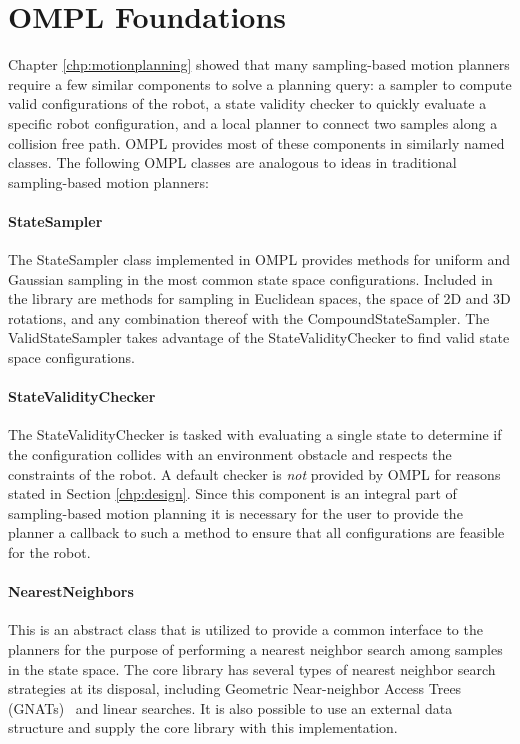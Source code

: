 \section {OMPL Foundations}
Chapter \ref{chp:motionplanning} showed that many sampling-based motion planners
require a few similar components to solve a planning query: a sampler to compute
valid configurations of the robot, a state validity checker to quickly evaluate
a specific robot configuration, and a local planner to connect two samples along
a collision free path.  OMPL provides most of these components in similarly
named classes.  The following OMPL classes are analogous to ideas in traditional
sampling-based motion planners:

\paragraph {StateSampler} The StateSampler class implemented in OMPL
provides methods for uniform and Gaussian sampling in the most common state
space configurations.  Included in the library are methods for sampling
in Euclidean spaces, the space of 2D and 3D rotations, and any combination
thereof with the CompoundStateSampler.  The ValidStateSampler takes advantage
of the StateValidityChecker to find valid state space configurations.

\paragraph {StateValidityChecker} The StateValidityChecker is tasked with
evaluating a single state to determine if the configuration collides with an
environment obstacle and respects the constraints of the robot.  A default
checker is \emph{not} provided by OMPL for reasons stated in Section
\ref{chp:design}.  Since this component is an integral part of sampling-based
motion planning it is necessary for the user to provide the planner a callback
to such a method to ensure that all configurations are feasible for the robot.

\paragraph {NearestNeighbors} This is an abstract class that is utilized
to provide a common interface to the planners for the purpose of performing a
nearest neighbor search among samples in the state space.  The core library
has several types of nearest neighbor search strategies at its disposal,
including Geometric Near-neighbor Access Trees (GNATs)~\cite{Brin:1995}
and linear searches.
It is also possible to use an external data structure and supply the core library
with this implementation.

